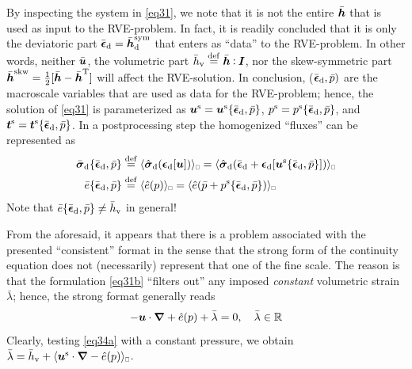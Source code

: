 \documentclass{bmcart}
\newcommand{\eqtref}[1]{\eqref{#1}}
\DeclarePairedDelimiter{\homgen}{\langle}{\rangle_\rve}
\renewcommand{\dev}{\mathrm{d}}
\renewcommand{\vol}{\mathrm{v}}
\newcommand{\epspargs}{\{{\bar{\ts\epsilon}}_\dev, \bar{p}\}}
\newcommand{\rve}{
  {\mathchoice
   {\mbox{\scalebox{0.67}{$\Box$}}}
   {\mbox{\scalebox{0.67}{$\Box$}}}
   {\mbox{\scalebox{0.5}{$\Box$}}}
   {\mbox{\scalebox{0.375}{$\Box$}}}
  }
}
\begin{document}
By inspecting the system in \eqtref{eq31}, we note that it is not the entire $\bar{\boldsymbol{h}}$ that is used as input to the RVE-problem.
In fact, it is readily concluded that it is only the deviatoric part $\bar{\ts\epsilon}_\dev=\bar{\ts{h}}^\sym_\dev$ that enters as ``data'' to the RVE-problem.
In other words, neither $\bar{\boldsymbol{u}}$, the volumetric part $\bar{h}_\vol\defeq\bar{\ts{h}}\dprod\ts{I}$, nor the skew-symmetric part $\bar{\boldsymbol{h}}^{\mathrm{skw}}=\frac{1}{2}[\bar{\boldsymbol{h}}-\bar{\boldsymbol{h}}^{\mathrm{T}}]$ will affect the RVE-solution.
In conclusion, ($\bar{\ts\epsilon}_\dev,\bar{p})$ are the macroscale variables that are used as data for the RVE-problem; hence, the solution of \eqtref{eq31} is parameterized as $\ta{u}^\fluct=\ta{u}^\fluct\epspargs$, $p^\fluct=p^\fluct\epspargs$, and $\ta{t}^\fluct=\ta{t}^\fluct\epspargs$.
In a postprocessing step the homogenized ``fluxes'' can be represented as
\begin{subequations}\label{eq33}
\begin{align}
    \bar{\ts\sigma}_\dev\epspargs &\defeq
    \homgen{ \hat{\ts{\sigma}}_\dev(\ts{\epsilon}_\dev[\ta{u}]) } =
    \homgen{  \hat{\ts{\sigma}}_\dev(\bar{\ts\epsilon}_\dev + \ts{\epsilon}_\dev[\ta{u}^\fluct\epspargs]) }
\label{eq33a} \\
    \bar{e}\epspargs &\defeq
    \homgen{ \hat{e}(p) } =
    \homgen{ \hat{e}(\bar{p} + p^\fluct\epspargs) }
\label{eq33b}
\end{align}
\end{subequations}
Note that $\bar{e}\epspargs\neq\bar{h}_\vol$ in general!

From the aforesaid, it appears that there is a problem associated with the presented ``consistent'' format in the sense that the strong form of the continuity equation does not (necessarily) represent that one of the fine scale.
The reason is that the formulation \eqtref{eq31b} ``filters out'' any imposed \emph{constant} volumetric strain $\bar{\lambda}$; hence, the strong format generally reads
\begin{equation}
    - \ta{u}\cdot\diff + \hat{e}(p) + \bar{\lambda} = 0, \quad \bar{\lambda}\in\set{R}
\label{eq34a}
\end{equation}
Clearly, testing \eqtref{eq34a} with a constant pressure, we obtain $\bar{\lambda}=\bar{h}_\vol+\homgen{\ta{u}^\fluct\cdot\diff-\hat{e}(p)}$.
\end{document}
